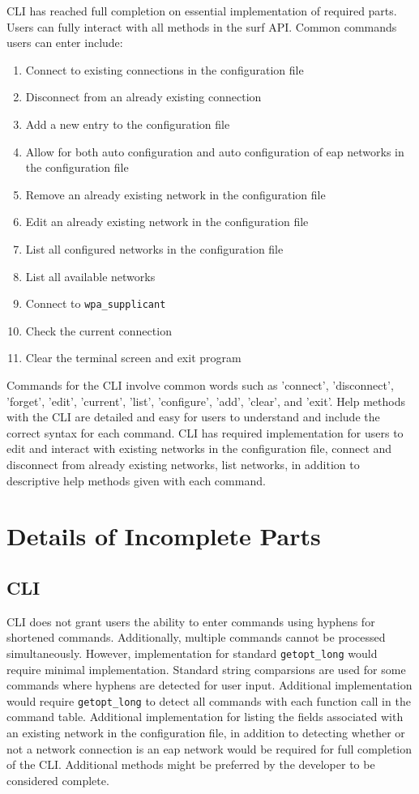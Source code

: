 \documentclass[11pt]{article}
\begin{document}
CLI has reached full completion on essential implementation of required parts. Users can 
fully interact with all methods in the surf API. Common commands users can enter include:
\begin{enumerate}
\item Connect to existing connections in the configuration file
\item Disconnect from an already existing connection
\item Add a new entry to the configuration file
\item Allow for both auto configuration and auto configuration of eap networks in the configuration file
\item Remove an already existing network in the configuration file
\item Edit an already existing network in the configuration file
\item List all configured networks in the configuration file
\item List all available networks
\item Connect to \texttt{wpa\_supplicant}
\item Check the current connection
\item Clear the terminal screen and exit program
\end{enumerate}
Commands for the CLI involve common words such as 'connect', 'disconnect', 'forget', 'edit', 
'current', 'list', 'configure', 'add', 'clear', and 'exit'. Help methods with the CLI are 
detailed and easy for users to understand and include the correct syntax for each command. 
CLI has required implementation for users to edit and interact with existing networks in the 
configuration file, connect and disconnect from already existing networks, list networks, in 
addition to descriptive help methods given with each command. 

\section*{Details of Incomplete Parts}
\subsection*{CLI}
CLI does not grant users the ability to enter commands using hyphens for shortened commands. 
Additionally, multiple commands cannot be processed simultaneously. However, implementation for 
standard \texttt{getopt\_long} would require minimal implementation. Standard string comparsions 
are used for some commands where hyphens are detected for user input. Additional implementation 
would require \texttt{getopt\_long} to detect all commands with each function call in the command 
table. Additional implementation for listing the fields associated with an existing network in the 
configuration file, in addition to detecting whether or not a network connection is an eap network 
would be required for full completion of the CLI. Additional methods might be preferred by the 
developer to be considered complete. 
\end{document}
